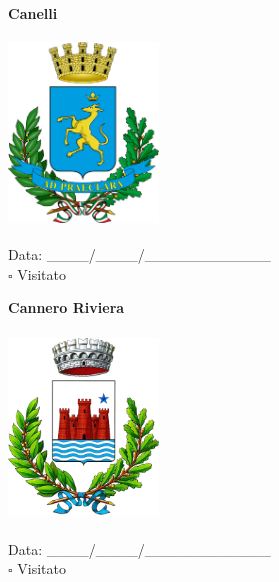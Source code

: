 \documentclass[a5paper,12pt]{article}
\begin{document}
\newpage

\noindent
\begin{minipage}[t]{0.45\textwidth}
    \begin{center}
        \textbf{Canelli}
    \end{center}
    \vspace{-0.5cm} %
    \begin{center}
        \includegraphics[height= 5cm, width=4cm]{Piemonte/Stemma Canelli.png}
    \end{center}
    \vspace{-0.4cm} %
    \begin{flushleft}
        Data: \_\_\_\_/\_\_\_\_/\_\_\_\_\_\_\_\_\_\_\_\_ \\
        $\square$ Visitato
    \end{flushleft}
\end{minipage}
\hfill
\noindent
\begin{minipage}[t]{0.45\textwidth}
    \begin{center}
        \textbf{Cannero Riviera}
    \end{center}
    \vspace{-0.5cm} %
    \begin{center}
        \includegraphics[height= 5cm, width=4cm]{Piemonte/Stemma Cannero Riviera.png}
    \end{center}
    \vspace{-0.4cm} %
    \begin{flushleft}
        Data: \_\_\_\_/\_\_\_\_/\_\_\_\_\_\_\_\_\_\_\_\_ \\
        $\square$ Visitato
    \end{flushleft}
\end{minipage}
\end{document}
